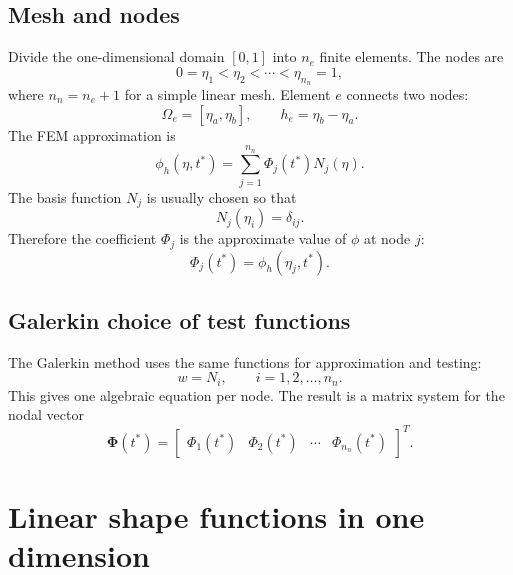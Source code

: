 \documentclass[11pt]{article}
\begin{document}
\subsection{Mesh and nodes}
Divide the one-dimensional domain \([0,1]\) into \(n_e\) finite elements. The nodes are
\begin{equation}
    0=\eta_1<\eta_2<\cdots<\eta_{n_n}=1,
\end{equation}
where \(n_n=n_e+1\) for a simple linear mesh. Element \(e\) connects two nodes:
\begin{equation}
    \Omega_e=[\eta_a,\eta_b],
    \qquad
    h_e=\eta_b-\eta_a.
\end{equation}
The FEM approximation is
\begin{equation}
    \boxed{
    \phi_h(\eta,t^*)=\sum_{j=1}^{n_n}\Phi_j(t^*)N_j(\eta).}
    \label{eq:fem_global_approx}
\end{equation}
The basis function \(N_j\) is usually chosen so that
\begin{equation}
    N_j(\eta_i)=\delta_{ij}.
\end{equation}
Therefore the coefficient \(\Phi_j\) is the approximate value of \(\phi\) at node \(j\):
\begin{equation}
    \Phi_j(t^*)=\phi_h(\eta_j,t^*).
\end{equation}

\subsection{Galerkin choice of test functions}
The Galerkin method uses the same functions for approximation and testing:
\begin{equation}
    w=N_i,
    \qquad i=1,2,\ldots,n_n.
\end{equation}
This gives one algebraic equation per node. The result is a matrix system for the nodal vector
\begin{equation}
    \bm{\Phi}(t^*)=
    \begin{bmatrix}
    \Phi_1(t^*) & \Phi_2(t^*) & \cdots & \Phi_{n_n}(t^*)
    \end{bmatrix}^{T}.
\end{equation}

\section{Linear shape functions in one dimension}
\end{document}

